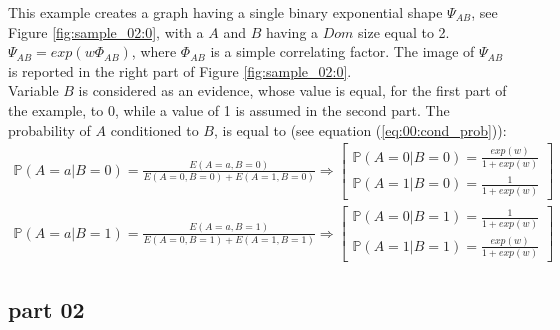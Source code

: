 This example creates a graph having a single binary exponential shape $\Psi_{AB}$, see Figure \ref{fig:sample_02:0}, with a $A$ and $B$ having a $Dom$ size equal to 2.  
$\Psi_{AB} = exp(w \Phi_{AB})$, where $\Phi_{AB}$ is a simple correlating factor. The image of $\Psi_{AB}$ is reported in the right part of Figure \ref{fig:sample_02:0}.
\\
Variable $B$ is considered as an evidence, whose value is equal, for the first part of the example, to 0, while a value of 1 is assumed in the second part.
The probability of $A$ conditioned to $B$, is equal to (see equation (\ref{eq:00:cond_prob})):
\begin{eqnarray}
\mathbb{P}(A = a | B = 0) = \frac{E(A = a, B = 0)}{E(A = 0, B = 0) + E(A = 1, B = 0)} 
\Rightarrow \begin{bmatrix}
\mathbb{P}(A = 0 | B = 0) = \frac{exp(w)}{1 + exp(w)}
\\ 
\mathbb{P}(A = 1 | B = 0) = \frac{1}{1 + exp(w)}
\end{bmatrix}
 \\
\mathbb{P}(A = a | B = 1) = \frac{E(A = a, B = 1)}{E(A = 0, B = 1) + E(A = 1, B = 1)} 
\Rightarrow \begin{bmatrix}
\mathbb{P}(A = 0 | B = 1) = \frac{1}{1 + exp(w)}
\\ 
\mathbb{P}(A = 1 | B = 1) = \frac{exp(w)}{1 + exp(w)}
\end{bmatrix}
\end{eqnarray}

\subsection{part 02}

